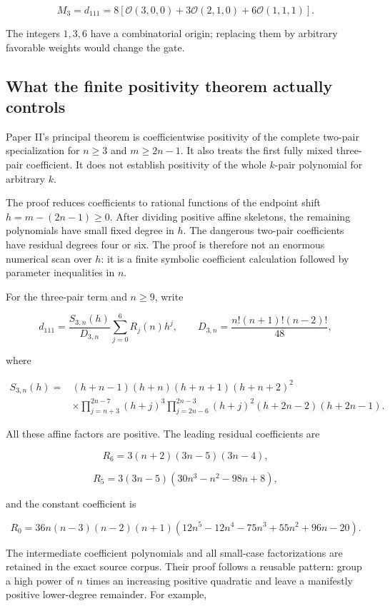\documentclass[
  10pt,
  a4paper,
  10pt,
  oneside,
  openany]{book}
\begin{document}
\[
 M_3=d_{111}=8[\mathcal O(3,0,0)
 +3\mathcal O(2,1,0)+6\mathcal O(1,1,1)].
 \tag{25.7}\label{eq:25.7}
\]

The integers \(1,3,6\) have a combinatorial origin; replacing them by
arbitrary favorable weights would change the gate.

\subsection{What the finite positivity theorem actually
controls}\label{what-the-finite-positivity-theorem-actually-controls}

Paper II's principal theorem is coefficientwise positivity of the
complete two-pair specialization for \(n\ge3\) and \(m\ge2n-1\). It also
treats the first fully mixed three-pair coefficient. It does not
establish positivity of the whole \(k\)-pair polynomial for arbitrary
\(k\).

The proof reduces coefficients to rational functions of the endpoint
shift \(h=m-(2n-1)\ge0\). After dividing positive affine skeletons, the
remaining polynomials have small fixed degree in \(h\). The dangerous
two-pair coefficients have residual degrees four or six. The proof is
therefore not an enormous numerical scan over \(h\): it is a finite
symbolic coefficient calculation followed by parameter inequalities in
\(n\).

For the three-pair term and \(n\ge9\), write

\[
 d_{111}=\frac{S_{3,n}(h)}{D_{3,n}}\sum_{j=0}^6R_j(n)h^j,
 \qquad D_{3,n}=\frac{n!(n+1)!(n-2)!}{48},
 \tag{25.8}\label{eq:25.8}
\]

where

\[
\begin{aligned}
S_{3,n}(h)={}&(h+n-1)(h+n)(h+n+1)(h+n+2)^2\\
&\times\prod_{j=n+3}^{2n-7}(h+j)^3
 \prod_{j=2n-6}^{2n-3}(h+j)^2(h+2n-2)(h+2n-1).
\end{aligned}
\]

All these affine factors are positive. The leading residual coefficients
are

\[
 R_6=3(n+2)(3n-5)(3n-4),
\]

\[
 R_5=3(3n-5)(30n^3-n^2-98n+8),
\]

and the constant coefficient is

\[
 R_0=36n(n-3)(n-2)(n+1)
 (12n^5-12n^4-75n^3+55n^2+96n-20).
 \tag{25.9}\label{eq:25.9}
\]

The intermediate coefficient polynomials and all small-case
factorizations are retained in the exact source corpus. Their proof
follows a reusable pattern: group a high power of \(n\) times an
increasing positive quadratic and leave a manifestly positive
lower-degree remainder. For example,
\end{document}
